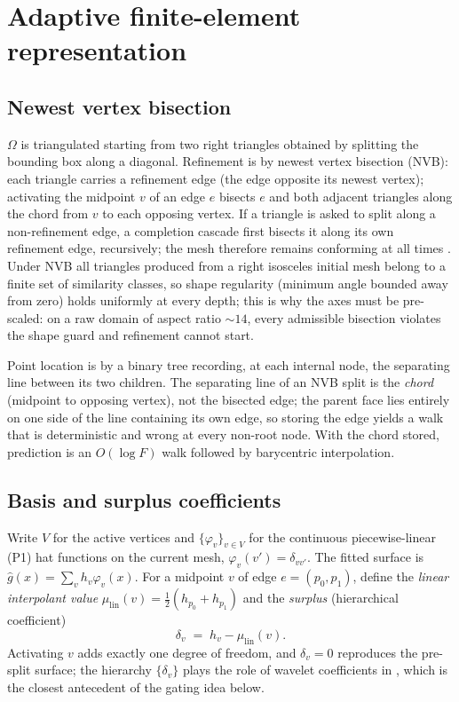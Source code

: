 \documentclass[11pt]{article}
\begin{document}
\section{Adaptive finite-element representation}\label{sec:representation}

\subsection{Newest vertex bisection}
$\Omega$ is triangulated starting from two right triangles obtained by splitting the
bounding box along a diagonal. Refinement is by newest vertex bisection (NVB): each
triangle carries a refinement edge (the edge opposite its newest vertex); activating the
midpoint $v$ of an edge $e$ bisects $e$ and both adjacent triangles along the chord from
$v$ to each opposing vertex. If a triangle is asked to split along a non-refinement
edge, a completion cascade first bisects it along its own refinement edge, recursively;
the mesh therefore remains conforming at all times \cite{mitchell1991,binev2004}. Under
NVB all triangles produced from a right isosceles initial mesh belong to a finite set of
similarity classes, so shape regularity (minimum angle bounded away from zero) holds
uniformly at every depth; this is why the axes must be pre-scaled: on a raw domain of
aspect ratio $\sim 14$, every admissible bisection violates the shape guard and
refinement cannot start.

Point location is by a binary tree recording, at each internal node, the separating
line between its two children. The separating line of an NVB split is the \emph{chord}
(midpoint to opposing vertex), not the bisected edge; the parent face lies entirely on
one side of the line containing its own edge, so storing the edge yields a walk that is
deterministic and wrong at every non-root node. With the chord stored, prediction is an
$O(\log F)$ walk followed by barycentric interpolation.

\subsection{Basis and surplus coefficients}
Write $V$ for the active vertices and $\{\varphi_v\}_{v\in V}$ for the continuous
piecewise-linear (P1) hat functions on the current mesh, $\varphi_v(v')=\delta_{vv'}$.
The fitted surface is $\hat g(x)=\sum_{v} h_v\varphi_v(x)$. For a midpoint $v$ of edge
$e=(p_0,p_1)$, define the \emph{linear interpolant value}
$\mu_{\mathrm{lin}}(v)=\tfrac12(h_{p_0}+h_{p_1})$ and the \emph{surplus} (hierarchical
coefficient)
\begin{equation}\label{eq:surplus}
\delta_v \;=\; h_v-\mu_{\mathrm{lin}}(v).
\end{equation}
Activating $v$ adds exactly one degree of freedom, and $\delta_v=0$ reproduces the
pre-split surface; the hierarchy $\{\delta_v\}$ plays the role of wavelet coefficients
in \cite{abramovich2006}, which is the closest antecedent of the gating idea below.
\end{document}
